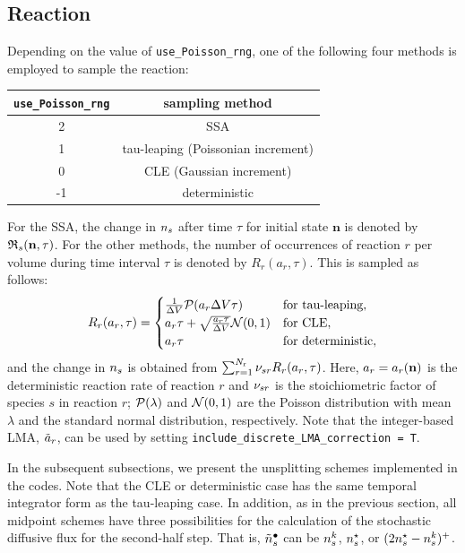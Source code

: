 \documentclass[final]{siamltex}
\newcommand{\nb}{\mathbf{n}}
\begin{document}

\subsection{Reaction}

Depending on the value of \texttt{use\_Poisson\_rng}, one of the following four methods is employed to sample the reaction:

\begin{center}
\begin{tabular}{|c|c|}
\hline 
\texttt{use\_Poisson\_rng} & sampling method \\
\hline
2 & SSA \\
1 & tau-leaping (Poissonian increment) \\
0 & CLE (Gaussian increment) \\
-1 & deterministic \\
\hline
\end{tabular}
\end{center}
For the SSA, the change in $n_s$ after time $\tau$ for initial state $\nb$ is denoted by $\Rfrak_s(\nb,\tau)$.
For the other methods, the number of occurrences of reaction $r$ per volume during time interval $\tau$ is denoted by $R_r(a_r,\tau)$.
This is sampled as follows:
\begin{equation}
R_r(a_r,\tau)=\begin{cases}
\frac{1}{{\Delta V}}\mathcal{P}(a_r{\Delta V}\tau)  & \mbox{for tau-leaping}, \\
a_r\tau+\sqrt{\frac{a_r\tau}{{\Delta V}}}\mathcal{N}(0,1) & \mbox{for CLE}, \\
a_r\tau & \mbox{for deterministic},
\end{cases}
\end{equation}
and the change in $n_s$ is obtained from $\sum_{r=1}^{N_\mathrm{r}} {\nu_{s r}} R_r (a_r,\tau)$.
Here, $\ar=\ar(\nb)$ is the deterministic reaction rate of reaction $r$ and ${\nu_{s r}}$ is the stoichiometric factor of species $s$ in reaction $r$;
$\mathcal{P}(\lambda)$ and $\mathcal{N}(0,1)$ are the Poisson distribution with mean $\lambda$ and the standard normal distribution, respectively.
Note that the integer-based LMA, ${\tilde{a}_r}$, can be used by setting \texttt{include\_discrete\_LMA\_correction = T}.

In the subsequent subsections, we present the unsplitting schemes implemented in the codes.
Note that the CLE or deterministic case has the same temporal integrator form as the tau-leaping case.
In addition, as in the previous section, all midpoint schemes have three possibilities for the calculation of the stochastic diffusive flux for the second-half step.
That is, $\tilde{n}_s^\bullet$ can be $n_s^k$, $n_s^\star$, or $(2n_s^\star-n_s^k)^+$.
\end{document}
